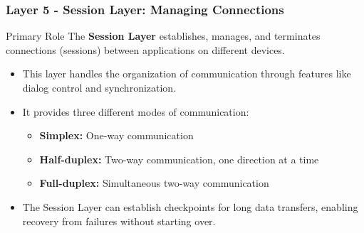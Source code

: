 \documentclass{beamer}
\begin{document}
\begin{frame}
    \frametitle{Layer 5 - Session Layer: Managing Connections}
    
    \begin{alertblock}{Primary Role}
        The \textbf{Session Layer} establishes, manages, and terminates connections (sessions) between applications on different devices.
    \end{alertblock}
    
    \begin{itemize}
        \item This layer handles the organization of communication through features like dialog control and synchronization.
        
        \item It provides three different modes of communication:
        \begin{itemize}
            \item \textbf{Simplex:} One-way communication
            \item \textbf{Half-duplex:} Two-way communication, one direction at a time
            \item \textbf{Full-duplex:} Simultaneous two-way communication
        \end{itemize}
        
        \item The Session Layer can establish checkpoints for long data transfers, enabling recovery from failures without starting over.
    \end{itemize}
\end{frame}
\end{document}
